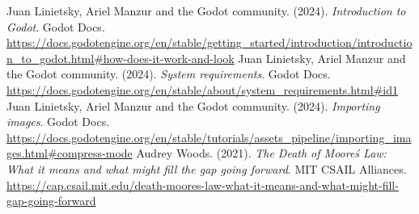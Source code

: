 
\begin{thebibliography}{99}
     Juan Linietsky, Ariel Manzur and the Godot community. (2024). \textit{Introduction to Godot}. Godot Docs. \url{https://docs.godotengine.org/en/stable/getting\_started/introduction/introduction\_to\_godot.html#how-does-it-work-and-look}
     Juan Linietsky, Ariel Manzur and the Godot community. (2024). \textit{System requirements}. Godot Docs. \url{https://docs.godotengine.org/en/stable/about/system_requirements.html#id1}
     Juan Linietsky, Ariel Manzur and the Godot community. (2024). \textit{Importing images}. Godot Docs. \url{https://docs.godotengine.org/en/stable/tutorials/assets\_pipeline/importing\_images.html#compress-mode}
     Audrey Woods. (2021). \textit{The Death of Moore\'s Law: What it means and what might fill the gap going forward}. MIT CSAIL Alliances. \url{https://cap.csail.mit.edu/death-moores-law-what-it-means-and-what-might-fill-gap-going-forward}
    
\end{thebibliography}
